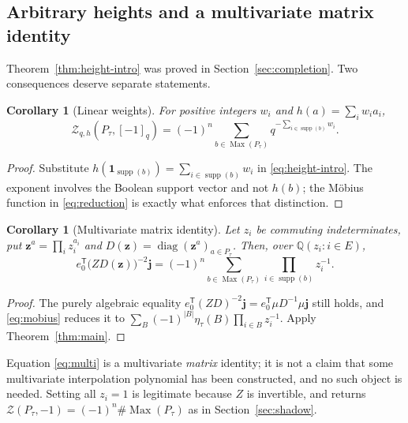 \documentclass[11pt]{article}
\numberwithin{equation}{section}
\newtheorem{corollary}[theorem]{Corollary}
\theoremstyle{definition}
\theoremstyle{remark}
\newcommand{\Q}{\mathbb Q}
\newcommand{\one}{\mathbf 1}
\newcommand{\supp}{\operatorname{supp}}
\newcommand{\Max}{\operatorname{Max}}
\newcommand{\qint}[1]{[#1]_q}
\newcommand{\Zeta}{\mathcal Z}
\begin{document}
\subsection{Arbitrary heights and a multivariate matrix identity}
\label{sec:heights}

Theorem~\ref{thm:height-intro} was proved in Section~\ref{sec:completion}. Two
consequences deserve separate statements.

\begin{corollary}[Linear weights]
\label{cor:height}
For positive integers $w_i$ and $h(a)=\sum_iw_ia_i$,
\begin{equation}
 \Zeta_{q,h}(P_\tau,\qint{-1})
   =(-1)^n\sum_{b\in\Max(P_\tau)}q^{-\sum_{i\in\supp(b)}w_i}.
 \label{eq:linear-height}
\end{equation}
\end{corollary}

\begin{proof}
Substitute $h(\one_{\supp(b)})=\sum_{i\in\supp(b)}w_i$ in
\eqref{eq:height-intro}. The exponent involves the Boolean support vector and
not $h(b)$; the M\"obius function in \eqref{eq:reduction} is exactly what
enforces that distinction.
\end{proof}

\begin{corollary}[Multivariate matrix identity]
\label{cor:multi}
Let $z_i$ be commuting indeterminates, put $\mathbf z^a=\prod_iz_i^{a_i}$ and
$D(\mathbf z)=\operatorname{diag}(\mathbf z^a)_{a\in P_\tau}$. Then, over
$\Q(z_i:i\in E)$,
\begin{equation}
 e_0^{\mathsf T}\bigl(ZD(\mathbf z)\bigr)^{-2}\mathbf j
    =(-1)^n\sum_{b\in\Max(P_\tau)}\prod_{i\in\supp(b)}z_i^{-1}.
 \label{eq:multi}
\end{equation}
\end{corollary}

\begin{proof}
The purely algebraic equality
$e_0^{\mathsf T}(ZD)^{-2}\mathbf j=e_0^{\mathsf T}\mu D^{-1}\mu\mathbf j$
still holds, and \eqref{eq:mobius} reduces it to
$\sum_B(-1)^{|B|}\eta_\tau(B)\prod_{i\in B}z_i^{-1}$. Apply
Theorem~\ref{thm:main}.
\end{proof}

Equation \eqref{eq:multi} is a multivariate \emph{matrix} identity; it is not
a claim that some multivariate interpolation polynomial has been constructed,
and no such object is needed. Setting all $z_i=1$ is legitimate because $Z$ is
invertible, and returns $\Zeta(P_\tau,-1)=(-1)^n\#\Max(P_\tau)$ as in
Section~\ref{sec:shadow}.
\end{document}
